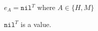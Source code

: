 \begin{case}
$e_{A}=\mathtt{nil}^{T}$ where $A\in\lbrace H,M\rbrace$

$\mathtt{nil}^{T}$ is a value.
\end{case}
